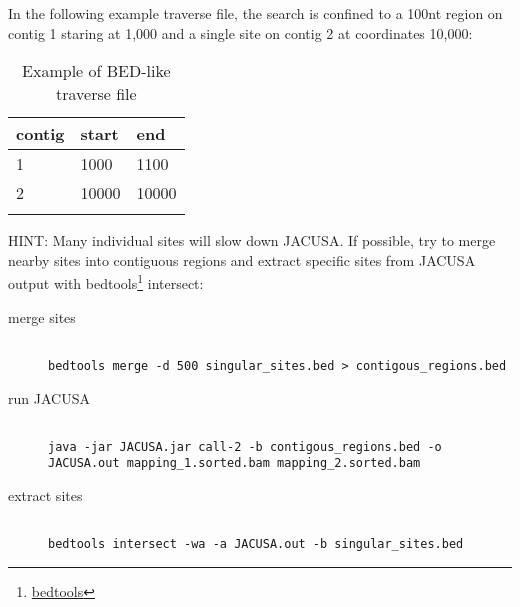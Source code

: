 \documentclass[10pt, a4paper]{article}
\begin{document}
In the following example traverse file, the search is confined to a 100nt region on contig 1
staring at 1,000 and a single site on contig 2 at coordinates 10,000:
\begin{table}
\centering
\caption{Example of BED-like traverse file}
\label{tb:traverse_file}
\begin{tabular}{lll}
\textbf{contig} & \textbf{start} & \textbf{end} \\
\hline
1 & 1000 & 1100 \\
2 & 10000 & 10000 \\
\multicolumn{3}{c}{}
\end{tabular}
\end{table}
HINT: Many individual sites will slow down JACUSA. If possible, try to merge nearby sites into
contiguous regions and extract specific sites from JACUSA output with
bedtools\footnote{\href{http://bedtools.readthedocs.org/en/latest/}{bedtools}} intersect:
\begin{description}
\item[merge sites] \begin{verbatim} 

bedtools merge -d 500 singular_sites.bed > contigous_regions.bed
\end{verbatim}
\item[run JACUSA] \begin{verbatim} 

java -jar JACUSA.jar call-2 -b contigous_regions.bed -o
JACUSA.out mapping_1.sorted.bam mapping_2.sorted.bam
\end{verbatim}
\item[extract sites] \begin{verbatim}

bedtools intersect -wa -a JACUSA.out -b singular_sites.bed
\end{verbatim}
\end{description}
\end{document}
